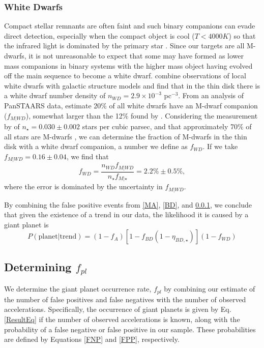 \subsubsection{White Dwarfs}
\label{WD}
Compact stellar remnants are often faint and such binary companions can evade direct detection, especially when the compact object is cool ($T < 4000 K$) so that the infrared light is dominated by the primary star \citep{Crepp13b}. Since our targets are all M-dwarfs, it is not unreasonable to expect that some may have formed as lower mass companions in binary systems with the higher mass object having evolved off the main sequence to become a white dwarf.  \citet{Napiwotzki09} combine observations of local white dwarfs with galactic structure models and find that in the thin disk there is a white dwarf number density of $n_{WD} = 2.9 \times 10^{-3}$ pc$^{-3}$. From an analysis of PanSTAARS data, \citet{Wheeler12} estimate 20\% of all white dwarfs have an M-dwarf companion ($f_{M|WD}$), somewhat larger than the 12\% found by \citet{Napiwotzki09}. Considering the measurement by \citet{Chang11} of $n_\star = 0.030 \pm 0.002$ stars per cubic parsec, and that approximately 70\% of all stars are M-dwarfs \citep[$f_{M|\star}$,][]{Henry06}, we can determine the fraction of M-dwarfs in the thin disk with a white dwarf companion, a number we define as $f_{WD}$. If we take $f_{M|WD} = 0.16 \pm 0.04$, we find that 
\begin{equation}
f_{WD} = \frac{n_{WD}f_{M|WD}}{n_\star f_{M|\star}} = 2.2\% \pm 0.5\%,
\end{equation}
where the error is dominated by the uncertainty in $f_{M|WD}$.

By combining the false positive events from \textsection\ref{MA}, \textsection\ref{BD}, and \textsection\ref{WD}, we conclude that given the existence of a trend in our data, the likelihood it is caused by a giant planet is 
\begin{equation}
P(\mbox{planet}|\mbox{trend}) = (1-f_A)[1-f_{BD}(1-\eta_{BD, \star})](1-f_{WD})
\label{FPP}
\end{equation}

\subsection{Determining $f_{pl}$}
\label{Methods}

We determine the giant planet occurrence rate, $f_{pl}$ by combining our estimate of the number of false positives and false negatives with the number of observed accelerations. Specifically, the occurrence of giant planets is given by Eq. \ref{ResultEq} if the number of observed accelerations is known, along with the probability of a false negative or false positive in our sample. These probabilities are defined by Equations \ref{FNP} and \ref{FPP}, respectively. 

